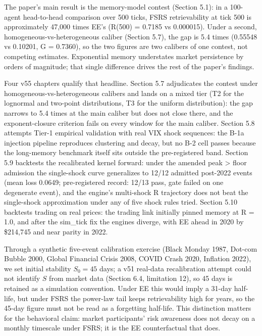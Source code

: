 \documentclass[11pt]{article}
\begin{document}
The paper's main result is the memory-model contest (Section 5.1): in a 100-agent head-to-head comparison over 500 ticks, FSRS retrievability at tick 500 is approximately 47,000 times EE's (R(500) = 0.7185 vs 0.000015). Under a second, homogeneous-vs-heterogeneous caliber (Section 5.7), the gap is 5.4 times (0.55548 vs 0.10201, G = 0.7360), so the two figures are two calibers of one contest, not competing estimates. Exponential memory understates market persistence by orders of magnitude; that single difference drives the rest of the paper's findings.

Four v55 chapters qualify that headline. Section 5.7 adjudicates the contest under homogeneous-vs-heterogeneous calibers and lands on a mixed tier (T2 for the lognormal and two-point distributions, T3 for the uniform distribution): the gap narrows to 5.4 times at the main caliber but does not close there, and the exponent-closure criterion fails on every window for the main caliber. Section 5.8 attempts Tier-1 empirical validation with real VIX shock sequences: the B-1a injection pipeline reproduces clustering and decay, but no B-2 cell passes because the long-memory benchmark itself sits outside the pre-registered band. Section 5.9 backtests the recalibrated kernel forward: under the amended peak > floor admission the single-shock curve generalizes to 12/12 admitted post-2022 events (mean loss 0.0649; pre-registered record: 12/13 pass, gate failed on one degenerate event), and the engine's multi-shock R trajectory does not beat the single-shock approximation under any of five shock rules tried. Section 5.10 backtests trading on real prices: the trading link initially pinned memory at R = 1.0, and after the sim\_tick fix the engines diverge, with EE ahead in 2020 by \$214,745 and near parity in 2022.

Through a synthetic five-event calibration exercise (Black Monday 1987, Dot-com Bubble 2000, Global Financial Crisis 2008, COVID Crash 2020, Inflation 2022), we set initial stability $S_0 = 45$ days; a v51 real-data recalibration attempt could not identify $S$ from market data (Section 6.4, limitation 12), so 45 days is retained as a simulation convention. Under EE this would imply a 31-day half-life, but under FSRS the power-law tail keeps retrievability high for years, so the 45-day figure must not be read as a forgetting half-life. This distinction matters for the behavioral claim: market participants' risk awareness does not decay on a monthly timescale under FSRS; it is the EE counterfactual that does.
\end{document}
